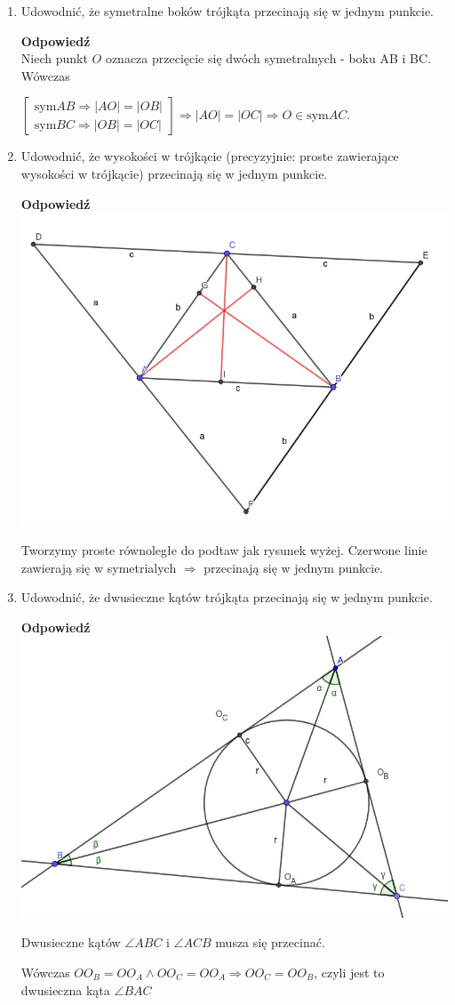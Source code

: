 \documentclass[12pt,a4paper]{article}
\theoremstyle{break}
\newcommand{\Odp}[1]{
		\begin{mdframed}[style=zadanie]
			\textbf{Odpowiedź}\\
			#1
		\end{mdframed}
	}
\begin{document}
\begin{enumerate}[1.]
	\item Udowodnić, że symetralne boków trójkąta przecinają się w jednym punkcie.
	\Odp{
		Niech punkt $O$ oznacza przecięcie się dwóch symetralnych - boku AB i BC. Wówczas
		
		$
		\begin{bmatrix}
			\text{sym} AB \Rightarrow |AO|=|OB|\\
			\text{sym} BC \Rightarrow |OB|=|OC|
		\end{bmatrix} \Rightarrow |AO| = |OC| \Rightarrow O \in \text{sym} AC
		$.
		
	}
	
	\item Udowodnić, że wysokości w trójkącie (precyzyjnie: proste zawierające wysokości w trójkącie) przecinają się w jednym punkcie.
	\Odp{
		\includegraphics[width=0.6\linewidth]{trj_proof_6.jpeg}
		
		Tworzymy proste równoległe do podtaw jak rysunek wyżej. Czerwone linie zawierają się w symetrialych $\Rightarrow$ przecinają się w jednym punkcie.
	}
	
	\item Udowodnić, że dwusieczne kątów trójkąta przecinają się w jednym punkcie.
	\Odp{
		\includegraphics[width=0.6\linewidth]{trj_proof_7.jpeg}
		
		Dwusieczne kątów $\angle ABC$ i $\angle ACB$ musza się przecinać.
	
		Wówczas $OO_B=OO_A \wedge OO_C=OO_A \Rightarrow OO_C=OO_B$, czyli jest to dwusieczna kąta $\angle BAC$ 
	}
	

\end{enumerate}
\end{document}
